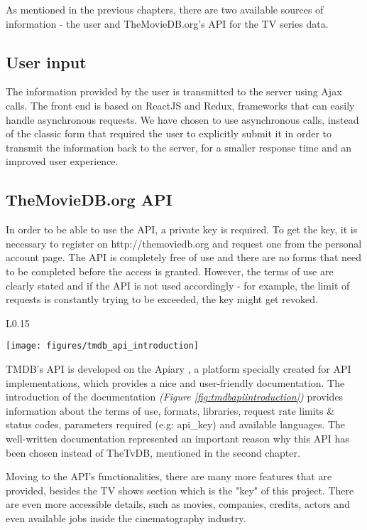 As mentioned in the previous chapters, there are two available sources of information - the user and TheMovieDB.org's API for the TV series data.

\subsection{User input}

The information provided by the user is transmitted to the server using Ajax calls. The front end is based on ReactJS and Redux, frameworks that can easily handle asynchronous requests. We have chosen to use asynchronous calls, instead of the classic form that required the user to explicitly submit it in order to transmit the information back to the server, for a smaller response time and an improved user experience.

\subsection{TheMovieDB.org API}

In order to be able to use the API, a private key is required. To get the key, it is necessary to register on http://themoviedb.org and request one from the personal account page. The API is completely free of use and there are no forms that need to be completed before the access is granted. However, the terms of use are clearly stated and if the API is not used accordingly - for example, the limit of requests is constantly trying to be exceeded, the key might get revoked.

\begin{wrapfigure}{L}{0.15\textwidth}
\caption{TMDB API Introduction}
\centering
\texttt{[image: figures/tmdb\_api\_introduction]}
\label{fig:tmdbapiintroduction}
\end{wrapfigure}

TMDB's API is developed on the Apiary \cite{16}, a platform specially created for API implementations, which provides a nice and user-friendly documentation. The introduction of the documentation \textit{(Figure \ref{fig:tmdbapiintroduction})} provides information about the terms of use, formats, libraries, request rate limits \& status codes, parameters required (e.g: api\_key) and available languages. The well-written documentation represented an important reason why this API has been chosen instead of TheTvDB, mentioned in the second chapter.

Moving to the API's functionalities, there are many more features that are provided, besides the TV shows section which is the "key" of this project. There are even more accessible details, such as movies, companies, credits, actors and even available jobs inside the cinematography industry.

